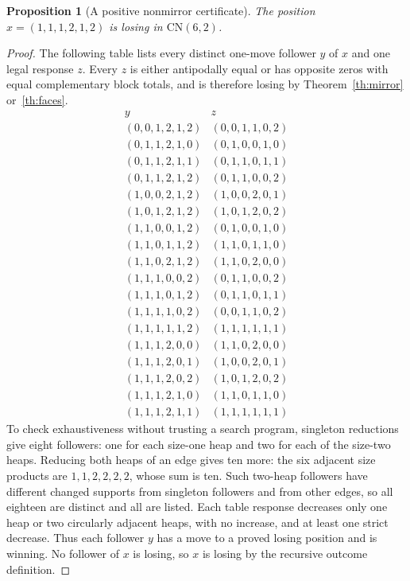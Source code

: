 \documentclass[11pt,a4paper]{article}
\newtheorem{proposition}[theorem]{Proposition}
\theoremstyle{definition}
\theoremstyle{remark}
\begin{document}
\begin{proposition}[A positive nonmirror certificate]\label{pr:positive}
The position $x=(1,1,1,2,1,2)$ is losing in $\mathrm{CN}(6,2)$.
\end{proposition}
\begin{proof}
The following table lists every distinct one-move follower $y$ of $x$ and one legal response $z$. Every $z$ is either antipodally equal or has opposite zeros with equal complementary block totals, and is therefore losing by Theorem~\ref{th:mirror} or~\ref{th:faces}.
\[
\begin{array}{c|c}
 y&z\\\hline
(0,0,1,2,1,2)&(0,0,1,1,0,2)\\
(0,1,1,2,1,0)&(0,1,0,0,1,0)\\
(0,1,1,2,1,1)&(0,1,1,0,1,1)\\
(0,1,1,2,1,2)&(0,1,1,0,0,2)\\
(1,0,0,2,1,2)&(1,0,0,2,0,1)\\
(1,0,1,2,1,2)&(1,0,1,2,0,2)\\
(1,1,0,0,1,2)&(0,1,0,0,1,0)\\
(1,1,0,1,1,2)&(1,1,0,1,1,0)\\
(1,1,0,2,1,2)&(1,1,0,2,0,0)\\
(1,1,1,0,0,2)&(0,1,1,0,0,2)\\
(1,1,1,0,1,2)&(0,1,1,0,1,1)\\
(1,1,1,1,0,2)&(0,0,1,1,0,2)\\
(1,1,1,1,1,2)&(1,1,1,1,1,1)\\
(1,1,1,2,0,0)&(1,1,0,2,0,0)\\
(1,1,1,2,0,1)&(1,0,0,2,0,1)\\
(1,1,1,2,0,2)&(1,0,1,2,0,2)\\
(1,1,1,2,1,0)&(1,1,0,1,1,0)\\
(1,1,1,2,1,1)&(1,1,1,1,1,1)
\end{array}
\]
To check exhaustiveness without trusting a search program, singleton reductions give eight followers: one for each size-one heap and two for each of the size-two heaps. Reducing both heaps of an edge gives ten more: the six adjacent size products are $1,1,2,2,2,2$, whose sum is ten. Such two-heap followers have different changed supports from singleton followers and from other edges, so all eighteen are distinct and all are listed. Each table response decreases only one heap or two circularly adjacent heaps, with no increase, and at least one strict decrease. Thus each follower $y$ has a move to a proved losing position and is winning. No follower of $x$ is losing, so $x$ is losing by the recursive outcome definition.
\end{proof}
\end{document}
